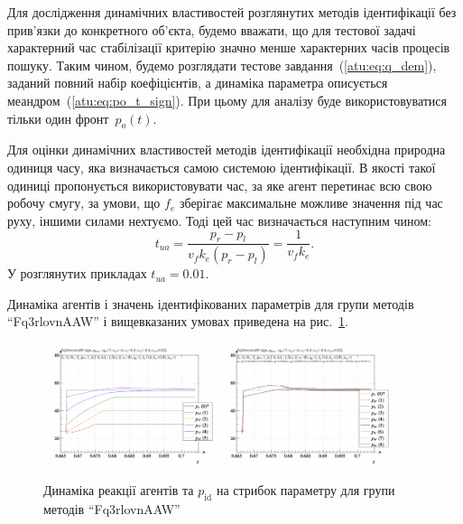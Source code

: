 \documentclass[a4paper,13pt]{atuaref}
\begin{document}
Для дослідження динамічних властивостей розглянутих методів ідентифікації без
прив'язки до конкретного об'єкта, будемо вважати, що для тестової задачі
характерний час стабілізації критерію значно менше характерних часів процесів
пошуку.
Таким чином, будемо розглядати тестове завдання~(\ref{atu:eq:q_dem}),
заданий повний набір коефіцієнтів, а динаміка параметра описується меандром~(\ref{atu:eq:po_t_sign}).
При цьому для аналізу буде використовуватися тільки один фронт~$p_o(t)$.

Для оцінки динамічних властивостей методів ідентифікації необхідна природна
одиниця часу, яка визначається самою системою ідентифікації. В якості такої
одиниці пропонується використовувати час, за яке агент перетинає всю свою
робочу смугу, за умови, що $ f_e $ зберігає максимальне можливе значення під
час руху, іншими силами нехтуємо. Тоді цей час визначається наступним чином:
%
\begin{equation}
  t_{ua} = \frac{p_r - p_l}{ v_f k_e (p_r - p_l)} = \frac{1}{v_f k_e}.
  \label{atu:eq:t_ua}
\end{equation}
%
У розглянутих прикладах $t_{ua} = 0.01$.

Динаміка агентів і значень ідентифікованих параметрів для групи методів
``Fq3rlovnAAW'' і вищевказаних умовах приведена на рис.~\ref{atu:f:Fq3rlovnAAW_sign}.

\begin{figure}[htb!]
  \centerline{
    \includegraphics[width=0.45\textwidth]{p3/p/sign/qls-p_t_pi_m_Fq3rlovnAAW_sign.png}
    \hfill
    \includegraphics[width=0.45\textwidth]{p3/p/sign/qls-p_t_p_m_Fq3rlovnAAW_sign.png}
  }
  \caption{Динаміка реакції агентів та $p_\mathrm{id}$ на стрибок параметру для групи методів ``Fq3rlovnAAW''}
  \label{atu:f:Fq3rlovnAAW_sign}
\end{figure}
\end{document}
